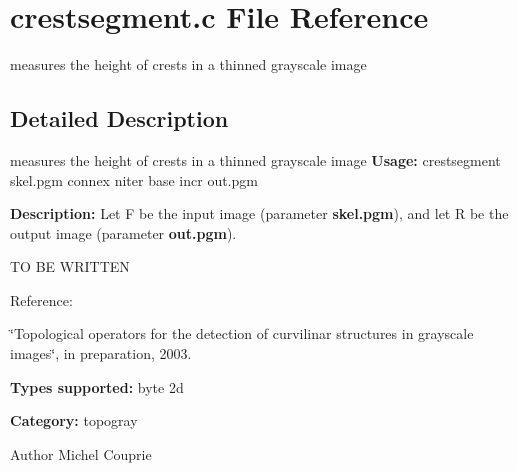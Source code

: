 \section{crestsegment.c File Reference}
\label{crestsegment_8c}


measures the height of crests in a thinned grayscale image  




\subsection{Detailed Description}
measures the height of crests in a thinned grayscale image {\bfseries Usage:} crestsegment skel.pgm connex niter base incr out.pgm

{\bfseries Description:} Let F be the input image (parameter {\bfseries skel.pgm}), and let R be the output image (parameter {\bfseries out.pgm}).

TO BE WRITTEN

Reference:\par
 \char`\"{}Topological operators for the detection of
curvilinar structures in grayscale images\char`\"{}, in preparation, 2003.

{\bfseries Types supported:} byte 2d

{\bfseries Category:} topogray

\begin{DoxyAuthor}{Author}
Michel Couprie 
\end{DoxyAuthor}
